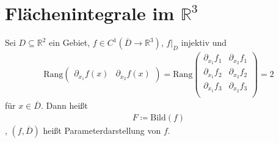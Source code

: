 \documentclass[a4paper,10pt]{scrbook}
\begin{document}
%
%

\section{Flächenintegrale im \texorpdfstring{$\mathbb{R}^3$}{R\textsuperscript{3}}}
\addtocounter{thmn}{1}
\setcounter{theorem}{0}


\begin{theorem}[Definition]
  Sei $D \subseteq \mathbb{R}^2$ ein Gebiet, $f \in C^1(\overline{D} \to \mathbb{R}^3)$, $f|_D$ injektiv und
  \begin{align*}
    \mathrm{Rang}\begin{pmatrix} \partial_{x_1} f(x) & \partial_{x_2} f(x) \end{pmatrix}
    = \mathrm{Rang}
    \begin{pmatrix}
      \partial_{x_1} f_1 & \partial_{x_2} f_1 \\
      \partial_{x_1} f_2& \partial_{x_2} f_2 \\
      \partial_{x_1} f_3 & \partial_{x_2} f_3 \\
    \end{pmatrix}
    = 2
  \end{align*}
  für $x \in \overline{D}$. Dann heißt
  \begin{align*}
    F \coloneq \mathrm{Bild}(f)
  \end{align*}
  , $(f,\overline{D})$ heißt Parameterdarstellung von $f$.
\end{theorem}
\end{document}
